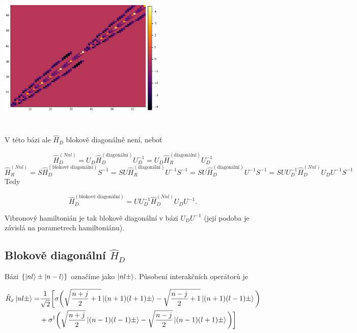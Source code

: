 \documentclass{article}
\begin{document}
    \begin{center}
        \includegraphics[width=8cm, height=7cm]{ham.png}
    \end{center}
   


    V této bázi ale $\hat{H}_D$ blokově diagonálně není, neboť

    $$\hat{H}_D^{(Nnl)} = U_D \hat{H}_D^{(\text{diagonální})} U_D^{-1} = U_D \hat{H}_R^{(\text{diagonální})} U_D^{-1} $$
    $$\hat{H}_R^{(Nnl)} = S \hat{H}_D^{(\text{blokově diagonální})} S^{-1} =  S U \hat{H}_R^{(\text{diagonální})} U^{-1} S^{-1} 
    = S U \hat{H}_D^{(\text{diagonální})} U^{-1} S^{-1}  = S U U_D^{-1} \hat{H}_D^{(Nnl)}U_D U^{-1} S^{-1} $$
Tedy 

$$\hat{H}_D^{(\text{blokově diagonální})} = U U_D^{-1} \hat{H}_D^{(Nnl)}U_D U^{-1}.$$

Vibronový hamiltonián je tak blokově diagonální v bázi $U_D U^{-1}$ (její podoba je závislá na parametrech hamiltoniánu).
   
\subsection{Blokově diagonální $\hat{H}_D$}

Bázi $\{\ket{n l} \pm \ket{n-l}\}$ označíme jako $\ket{nl\pm}$. Působení interakčních operátorů je

\begin{align*}
    \hat{R}_x \ket{nl\pm} =&
\frac{1}{\sqrt{2}}\bigg[
\sigma \bigg(\sqrt{\frac{n + j}{2} + 1} \ket{(n+1) (l+1) \pm} - \sqrt{\frac{n - j}{2} + 1} \ket{(n+1) (l-1) \pm}\bigg)  \\
 &+\sigma^{\dagger} \bigg(\sqrt{\frac{n + j}{2}} \ket{(n-1) (l-1) \pm} - \sqrt{\frac{n - j}{2}} \ket{(n-1) (l+1) \pm}\bigg)   
\bigg]
\end{align*}
\end{document}
